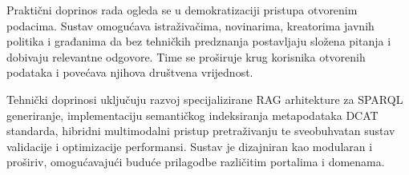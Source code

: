 Praktični doprinos rada ogleda se u demokratizaciji pristupa otvorenim podacima. Sustav omogućava istraživačima, novinarima, kreatorima javnih politika i građanima da bez tehničkih predznanja postavljaju složena pitanja i dobivaju relevantne odgovore. Time se proširuje krug korisnika otvorenih podataka i povećava njihova društvena vrijednost.

Tehnički doprinosi uključuju razvoj specijalizirane RAG arhitekture za SPARQL generiranje, implementaciju semantičkog indeksiranja metapodataka DCAT standarda, hibridni multimodalni pristup pretraživanju te sveobuhvatan sustav validacije i optimizacije performansi. Sustav je dizajniran kao modularan i proširiv, omogućavajući buduće prilagodbe različitim portalima i domenama.
